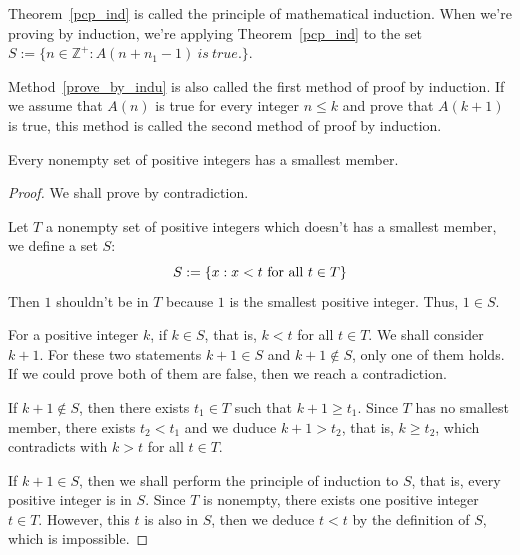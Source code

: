 \documentclass[a4paper]{ctexart}
\begin{document}
	\begin{myrmk}
		Theorem~\ref{pcp_ind} is called the principle of mathematical induction. When we're proving by induction, we're applying Theorem~\ref{pcp_ind} to the set $S:=\{n\in \mathbb{Z}^+:A(n+n_1-1)\ is\ true.\}$.
	\end{myrmk}
	\begin{myrmk}
		Method~\ref{prove_by_indu} is also called the first method of proof by induction. If we assume that $A(n)$ is true for every integer $n\le k$ and prove that $A(k+1)$ is true, this method is called the second method of proof by induction.
	\end{myrmk}
	\begin{mythm}\label{pcp_wod}
		Every nonempty set of positive integers has a smallest member.
	\end{mythm}
	\begin{proof}
		We shall prove by contradiction.
		
		Let $T$ a nonempty set of positive integers which doesn't has a smallest member, we define a set $S$:
		\begin{equation}
			S:=\{x:x<t\text{ for all } t \in T\}\notag
		\end{equation}
		Then $1$ shouldn't be in $T$ because $1$ is the smallest positive integer. Thus, $1 \in S$. 
		
		For a positive integer $k$, if $k\in S$, that is, $k<t$ for all $t\in T$. We shall consider $k+1$. For these two statements $k+1\in S$ and $k+1 \notin S$, only one of them holds. If we could prove both of them are false, then we reach a contradiction. 
		
		If $k+1 \notin S$, then there exists $t_1\in T$ such that $k+1\ge t_1$. Since $T$ has no smallest member, there exists $t_2 < t_1$ and we duduce $k+1>t_2$, that is, $k \ge t_2$, which contradicts with $k>t$ for all $t\in T$. 
		
		If $k+1\in S$, then we shall perform the principle of induction to $S$, that is, every positive integer is in $S$. Since $T$ is nonempty, there exists one positive integer $t\in T$. However, this $t$ is also in $S$, then we deduce $t<t$ by the definition of $S$, which is impossible.
		
	\end{proof}
\end{document}

